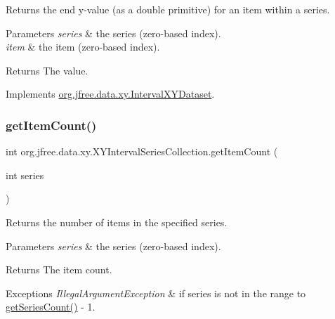 Returns the end y-\/value (as a double primitive) for an item within a series.


\begin{DoxyParams}{Parameters}
{\em series} & the series (zero-\/based index). \\
\hline
{\em item} & the item (zero-\/based index).\\
\hline
\end{DoxyParams}
\begin{DoxyReturn}{Returns}
The value. 
\end{DoxyReturn}


Implements \mbox{\hyperlink{interfaceorg_1_1jfree_1_1data_1_1xy_1_1_interval_x_y_dataset_a0538ada774aad34ec95edbb84c1a82e1}{org.\+jfree.\+data.\+xy.\+Interval\+X\+Y\+Dataset}}.

\mbox{\label{classorg_1_1jfree_1_1data_1_1xy_1_1_x_y_interval_series_collection_a5cc746cbd6f7de1b6593782a3c5b6739}} 
\subsubsection{\texorpdfstring{get\+Item\+Count()}{getItemCount()}}
{\footnotesize\ttfamily int org.\+jfree.\+data.\+xy.\+X\+Y\+Interval\+Series\+Collection.\+get\+Item\+Count (\begin{DoxyParamCaption}\item[{int}]{series }\end{DoxyParamCaption})}

Returns the number of items in the specified series.


\begin{DoxyParams}{Parameters}
{\em series} & the series (zero-\/based index).\\
\hline
\end{DoxyParams}
\begin{DoxyReturn}{Returns}
The item count.
\end{DoxyReturn}

\begin{DoxyExceptions}{Exceptions}
{\em Illegal\+Argument\+Exception} & if {\ttfamily series} is not in the range {} to {\ttfamily \mbox{\hyperlink{classorg_1_1jfree_1_1data_1_1xy_1_1_x_y_interval_series_collection_aae35bb3146172522ddd725598891b555}{get\+Series\+Count()}} -\/ 1}. \\
\hline
\end{DoxyExceptions}


